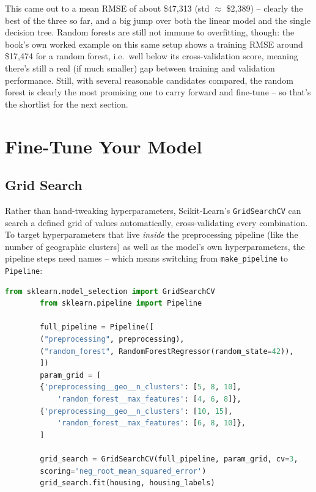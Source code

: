 \documentclass[11pt]{article}
\begin{document}
	This came out to a mean RMSE of about \$47,313 (std $\approx$ \$2,389) -- clearly the best of the three so far, and a big jump over both the linear model and the single decision tree. Random forests are still not immune to overfitting, though: the book's own worked example on this same setup shows a training RMSE around \$17,474 for a random forest, i.e.\ well below its cross-validation score, meaning there's still a real (if much smaller) gap between training and validation performance. Still, with several reasonable candidates compared, the random forest is clearly the most promising one to carry forward and fine-tune -- so that's the shortlist for the next section.
	
	\section{Fine-Tune Your Model}
	
	\subsection{Grid Search}
	
	Rather than hand-tweaking hyperparameters, Scikit-Learn's \texttt{GridSearchCV} can search a defined grid of values automatically, cross-validating every combination. To target hyperparameters that live \emph{inside} the preprocessing pipeline (like the number of geographic clusters) as well as the model's own hyperparameters, the pipeline steps need names -- which means switching from \texttt{make\_pipeline} to \texttt{Pipeline}:
	
	\begin{lstlisting}[language=Python]
		from sklearn.model_selection import GridSearchCV
		from sklearn.pipeline import Pipeline
		
		full_pipeline = Pipeline([
		("preprocessing", preprocessing),
		("random_forest", RandomForestRegressor(random_state=42)),
		])
		param_grid = [
		{'preprocessing__geo__n_clusters': [5, 8, 10],
			'random_forest__max_features': [4, 6, 8]},
		{'preprocessing__geo__n_clusters': [10, 15],
			'random_forest__max_features': [6, 8, 10]},
		]
		
		grid_search = GridSearchCV(full_pipeline, param_grid, cv=3,
		scoring='neg_root_mean_squared_error')
		grid_search.fit(housing, housing_labels)
	\end{lstlisting}
	
\end{document}
